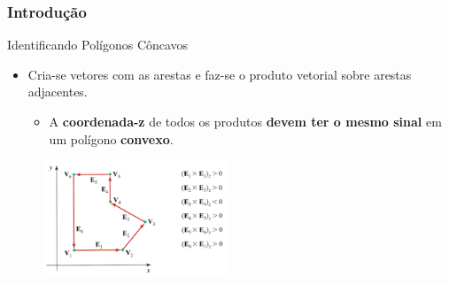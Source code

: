 \documentclass{beamer}
\begin{document}
\begin{frame}
\frametitle{Introdução}

		\begin{block}{Identificando Polígonos Côncavos}
		\begin{itemize}
			\item Cria-se vetores com as arestas e faz-se  o produto vetorial sobre arestas adjacentes.
				\begin{itemize}
					\item A \textbf{coordenada-z} de todos os produtos \textbf{devem ter o mesmo sinal} em um polígono \textbf{convexo}.
				\end{itemize}
		\end{itemize}
		\end{block}
		
		\begin{figure}[!h]
			\begin{center}
				\includegraphics[width=0.5\textwidth]{Figures/PolConAre}
			\end{center}
		\end{figure}
	
\end{frame}
\end{document}
